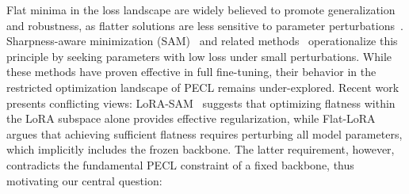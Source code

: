 \documentclass{article}
\theoremstyle{plain}
\theoremstyle{definition}
\theoremstyle{remark}
\begin{document}
Flat minima in the loss landscape are widely believed to promote generalization and robustness, as flatter solutions are less sensitive to parameter perturbations~\citep{FlatMinima1997,wu2017understandinggeneralizationdeeplearning,chaudhariEntropySGDBiasingGradient2019,NEURIPS2020_518a38cc,NEURIPS2021_995f5e03,JMLRAnEmpiricalInvestigatio,yangRevisitingFlatnessAwareOptimization2025}.
Sharpness-aware minimization (SAM)~\cite{foretSharpnessAwareMinimizationEfficiently2021} and related methods~\citep{pmlr-v151-bisla22a,zhangGradientNormAware2023,NEURIPS2024_C-Flat} operationalize this principle by seeking parameters with low loss  under small perturbations. 
While these methods have proven effective in full fine-tuning, their behavior in the restricted optimization landscape of PECL remains under-explored. 
Recent work presents conflicting views: LoRA-SAM~\citep{NEURIPS2024_4eb2c0ad} suggests that optimizing flatness within the LoRA subspace alone provides effective regularization, while Flat-LoRA~\citep{li2025flatloralowrankadaptationflat} argues that achieving sufficient flatness requires perturbing all model parameters, which implicitly includes the frozen backbone. The latter requirement, however, contradicts the fundamental PECL constraint of a fixed backbone, thus motivating our central question:


\end{document}

